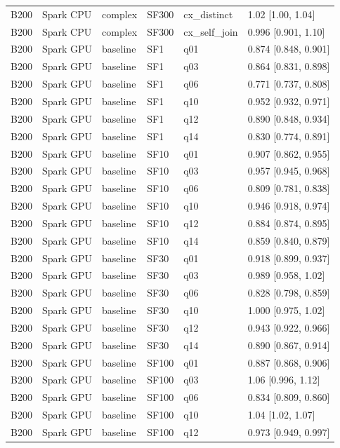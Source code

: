 \begin{longtable}{llllll}
B200 & Spark CPU & complex & SF300 & cx\_distinct & 1.02 [1.00, 1.04] \\
B200 & Spark CPU & complex & SF300 & cx\_self\_join & 0.996 [0.901, 1.10] \\
B200 & Spark GPU & baseline & SF1 & q01 & 0.874 [0.848, 0.901] \\
B200 & Spark GPU & baseline & SF1 & q03 & 0.864 [0.831, 0.898] \\
B200 & Spark GPU & baseline & SF1 & q06 & 0.771 [0.737, 0.808] \\
B200 & Spark GPU & baseline & SF1 & q10 & 0.952 [0.932, 0.971] \\
B200 & Spark GPU & baseline & SF1 & q12 & 0.890 [0.848, 0.934] \\
B200 & Spark GPU & baseline & SF1 & q14 & 0.830 [0.774, 0.891] \\
B200 & Spark GPU & baseline & SF10 & q01 & 0.907 [0.862, 0.955] \\
B200 & Spark GPU & baseline & SF10 & q03 & 0.957 [0.945, 0.968] \\
B200 & Spark GPU & baseline & SF10 & q06 & 0.809 [0.781, 0.838] \\
B200 & Spark GPU & baseline & SF10 & q10 & 0.946 [0.918, 0.974] \\
B200 & Spark GPU & baseline & SF10 & q12 & 0.884 [0.874, 0.895] \\
B200 & Spark GPU & baseline & SF10 & q14 & 0.859 [0.840, 0.879] \\
B200 & Spark GPU & baseline & SF30 & q01 & 0.918 [0.899, 0.937] \\
B200 & Spark GPU & baseline & SF30 & q03 & 0.989 [0.958, 1.02] \\
B200 & Spark GPU & baseline & SF30 & q06 & 0.828 [0.798, 0.859] \\
B200 & Spark GPU & baseline & SF30 & q10 & 1.000 [0.975, 1.02] \\
B200 & Spark GPU & baseline & SF30 & q12 & 0.943 [0.922, 0.966] \\
B200 & Spark GPU & baseline & SF30 & q14 & 0.890 [0.867, 0.914] \\
B200 & Spark GPU & baseline & SF100 & q01 & 0.887 [0.868, 0.906] \\
B200 & Spark GPU & baseline & SF100 & q03 & 1.06 [0.996, 1.12] \\
B200 & Spark GPU & baseline & SF100 & q06 & 0.834 [0.809, 0.860] \\
B200 & Spark GPU & baseline & SF100 & q10 & 1.04 [1.02, 1.07] \\
B200 & Spark GPU & baseline & SF100 & q12 & 0.973 [0.949, 0.997] \\

\end{longtable}
